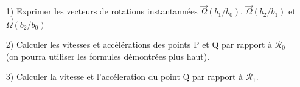 \documentclass[a4paper,12pt]{article}
\begin{document}
\begin{itemize}
\item[1)] Exprimer les vecteurs de rotations instantannées $\vec{\Omega}(b_1/b_0)$, $\vec{\Omega}(b_2/b_1)$ et $\vec{\Omega}(b_2/b_0)$
\item[2)] Calculer les vitesses et accélérations des points P et Q par rapport à $\mathcal{R}_0$ (on pourra utiliser les formules démontrées plus haut).
\item[3)] Calculer la vitesse et l'accéleration du point Q par rapport à $\mathcal{R}_1$.
\vspace{2mm}
\end{itemize}
\vspace{5mm}
\end{document}
